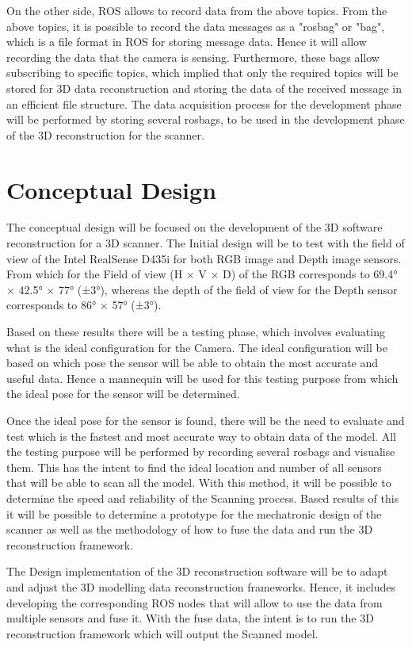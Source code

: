 \documentclass[12pt]{report}
\begin{document}
On the other side, ROS allows to record data from the above topics. From the above topics, it is possible to record the data messages as a "rosbag" or "bag", which is a file format in ROS for storing message data. Hence it will allow recording the data that the camera is sensing. 
Furthermore, these bags allow subscribing to specific topics, which implied that only the required topics will be stored for 3D data reconstruction and storing the data of the received message in an efficient file structure. 
The data acquisition process for the development phase will be performed by storing several rosbags, to be used in the development phase of the 3D reconstruction for the scanner.

\section{Conceptual Design}
The conceptual design will be focused on the development of the 3D software reconstruction for a 3D scanner. 
The Initial design will be to test with the field of view of the Intel RealSense D435i for both RGB image and Depth image sensors. From which for the Field of view (H × V × D) of the RGB corresponds to 69.4° × 42.5° × 77° (±3°),
whereas the depth of the field of view for the Depth sensor corresponds to 86° × 57° (±3°)\citep*{intelrealsense}.

Based on these results there will be a testing phase, which involves evaluating what is the ideal configuration for the Camera. The ideal configuration will be based on which pose the sensor will be able to obtain the most accurate and useful data. 
Hence a mannequin will be used for this testing purpose from which the ideal pose for the sensor will be determined. 
\enlargethispage{\baselineskip}

Once the ideal pose for the sensor is found, there will be the need to evaluate and test which is the fastest and most accurate way to obtain data of the model. All the testing purpose will be performed by recording several rosbags and visualise them.
This has the intent to find the ideal location and number of all sensors that will be able to scan all the model. With this method, it will be possible to determine the speed and reliability of the Scanning process. 
Based results of this it will be possible to determine a prototype for the mechatronic design of the scanner as well as the methodology of how to fuse the data and run the 3D reconstruction framework. 

The Design implementation of the 3D reconstruction software will be to adapt and adjust the 3D modelling data reconstruction frameworks. Hence, it includes developing the corresponding ROS nodes that will allow to use the data from multiple sensors and fuse it. 
With the fuse data, the intent is to run the 3D reconstruction framework which will output the Scanned model. 
\end{document}
